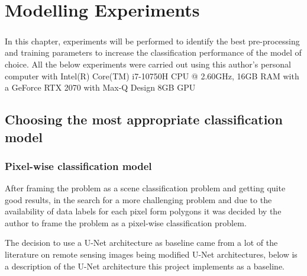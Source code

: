 \chapter{ Modelling Experiments} \label{experiments_chapter}
\paragraph{}
In this chapter, experiments will be performed to identify the best pre-processing and training parameters to increase the classification performance of the model of choice. 
All the below experiments were carried out using this author's personal computer with Intel(R) Core(TM) i7-10750H \gls{CPU} @ 2.60GHz, 16GB \gls{RAM} with a GeForce RTX 2070 with Max-Q Design 8GB \gls{GPU}
\section{Choosing the most appropriate classification model} \label{classification_models}
\subsection{Pixel-wise classification model} \label{pixel_model}
After framing the problem as a scene classification problem and getting quite good results, in the search for a more challenging problem and due to the availability of data labels for each pixel form polygons it was decided by the author to frame the problem as a pixel-wise classification problem.

The decision to use a U-Net architecture as baseline came from a lot of the literature on remote sensing images being modified U-Net architectures, below is a description of the U-Net architecture this project implements as a baseline.
